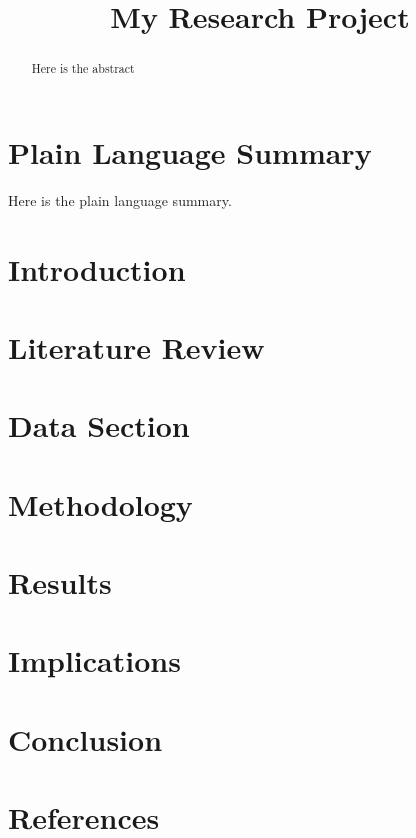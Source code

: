 \documentclass[
]{agujournal2019}
\begin{document}
\title{My Research Project}



\begin{abstract}
Here is the abstract
\end{abstract}

\section*{Plain Language Summary}
Here is the plain language summary.




\section{Introduction}\label{sec-intro}

\section{Literature Review}\label{sec-lit-review}

\section{Data Section}\label{sec-data}

\section{Methodology}\label{sec-methods}

\section{Results}\label{sec-results}

\section{Implications}\label{sec-implications}

\section{Conclusion}\label{sec-conclusion}

\section*{References}\label{references}
\end{document}
